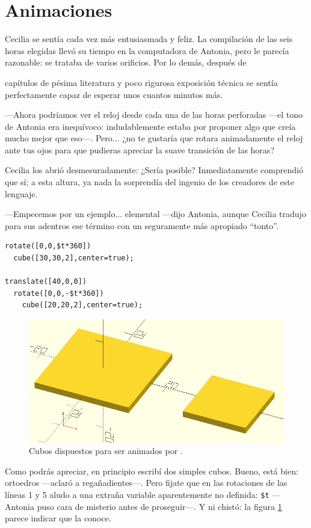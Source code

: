\section{Animaciones}

Cecilia se sentía cada vez más entusiasmada y feliz. La compilación de
las seis horas elegidas llevó su tiempo en la computadora de Antonia,
pero le parecía razonable: se trataba de varios orificios. Por lo
demás, después de
\setcounter{m}{\thechapter}\addtocounter{m}{0}\them{} capítulos de
pésima literatura y poco rigurosa exposición técnica se sentía
perfectamente capaz de esperar unos cuantos minutos más.

---Ahora podríamos ver el reloj desde cada una de las horas perforadas
---el tono de Antonia era inequívoco: indudablemente estaba por
proponer algo que creía mucho mejor que eso---. Pero... ¿no te
gustaría que \openscad{} rotara animadamente el reloj ante tus ojos
para que pudieras apreciar la suave transición de las horas?

Cecilia los abrió desmesuradamente: ¿Sería posible? Inmediatamente
comprendió que sí; a esta altura, ya nada la sorprendía del ingenio de
los creadores de este lenguaje.

---Empecemos por un ejemplo... elemental ---dijo Antonia, aunque
Cecilia tradujo para sus adentros ese término con un seguramente más
apropiado ``tonto''.

\begin{lstlisting}
rotate([0,0,$t*360])
  cube([30,30,2],center=true);
  
translate([40,0,0])
  rotate([0,0,-$t*360])
    cube([20,20,2],center=true);
\end{lstlisting}%

\begin{figure}[ht]
  \centering
  \includegraphics[width=.55\textwidth]{imagenes/animacion-0}  
  \caption{Cubos dispuestos para ser animados por \openscad.}
  \label{fig:animacion-0}
\end{figure}

\guillemotright Como podrás apreciar, en principio escribí dos simples
cubos. Bueno, está bien: ortoedros ---aclaró a
re\-ga\-ña\-dien\-tes---. Pero fijate que en las rotaciones de las
líneas 1 y 5 aludo a una extraña variable aparentemente no definida:
\texttt{\$t} ---Antonia puso cara de misterio antes de proseguir---. Y
\openscad{} ni chistó: la figura \ref{fig:animacion-0} parece indicar que
la conoce.

